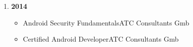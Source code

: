 \begin{enumerate}[itemsep=0pt,label={},leftmargin=*]
\begin{itemize}[label={},leftmargin=*]
        \item Kotlin for Android Development\hfill Acámica 
        \item Harnessing the Power of AI\hfill Acámica 
        \item Dart \& Introduction to Flutter\hfill Acámica
    \end{itemize}
  \item \textbf{2014}
    \begin{itemize}[label={},leftmargin=*]
        \item Android Security Fundamentals\hfill ATC Consultants Gmb 
        \item Certified Android Developer\hfill ATC Consultants Gmb
    \end{itemize}
\end{enumerate}